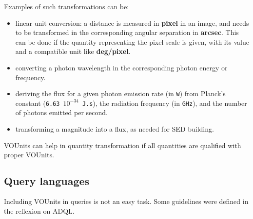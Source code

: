 \documentclass[12pt,notitlepage,onecolumn]{ivoa}
\newcommand{\unit}[1]{\textbf{\textsf{\color{orange}#1}}}
\begin{document}
Examples of such transformations can be:
\begin{itemize}
\item linear unit conversion: a distance is measured in \unit{pixel} in an image, and needs to be transformed in
the corresponding angular separation in \unit{arcsec}. This can be done if the quantity representing the pixel
scale is given, with its value and a compatible unit like \unit{deg/pixel}.
\item converting a photon wavelength in the corresponding photon energy or frequency.
\item deriving the flux for a given photon emission rate (in \texttt{W}) from Planck's
constant (\texttt{6.63 $10^{-34}$ J.s}), the radiation frequency (in \texttt{GHz}), and the
number of photons emitted per second.
\item transforming a magnitude into a flux, as needed for SED building.
\end{itemize}

VOUnits can help in quantity transformation if all quantities are qualified with proper VOUnits.

\subsection{Query languages}

Including VOUnits in queries is not an easy task. Some guidelines were defined in the
reflexion on ADQL.
\end{document}
